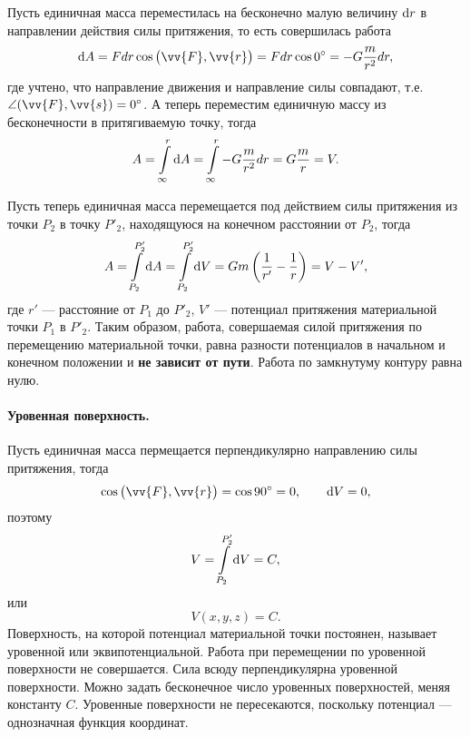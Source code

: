 \documentclass[11pt, a4paper]{article}
\theoremstyle{plain}
\theoremstyle{definition}
\theoremstyle{remark}
\begin{document}
Пусть единичная масса переместилась на бесконечно малую величину $\dif r$ в направлении действия силы
притяжения, то есть совершилась работа
\begin{equation*}
    \dif A = F dr \cos{\left( \vv{F}, \vv{r} \right)} =
    F dr \cos{0^\circ} = -G\dfrac{m}{r^2}dr,
\end{equation*}
где учтено, что направление движения и направление силы совпадают, т.е. $\angle (\vv{F},\vv{s}) =
0^\circ$. А теперь переместим единичную массу из бесконечности в притягиваемую точку, тогда
\begin{equation*}
    A = \int\limits_{\infty}^{r}\dif A = \int\limits_{\infty}^{r} -G\dfrac{m}{r^2}dr =
    G\dfrac{m}{r} = V.
\end{equation*}

Пусть теперь единичная масса перемещается под действием силы притяжения  из точки $P_2$ в точку $P'_2$,
находящуюся на конечном расстоянии от $P_2$, тогда
\begin{equation*}
    A = \int\limits_{P_2}^{P'_2}\dif A =  \int\limits_{P_2}^{P'_2}\dif V = Gm\left( \dfrac{1}{r'} - \dfrac{1}{r}\right) = 
    V - V',
\end{equation*}
где $r'$ --- расстояние от $P_1$ до $P'_2$, $V'$ --- потенциал притяжения материальной точки $P_1$ в
$P'_2$.
Таким образом, работа, совершаемая силой притяжения по перемещению материальной точки, равна
разности потенциалов в начальном и конечном положении и \textbf{не зависит от пути}. Работа по
замкнутуму контуру равна нулю.

\paragraph{Уровенная поверхность.}
Пусть единичная масса пермещается перпендикулярно направлению силы притяжения, тогда
\begin{equation*}
    \cos{\left( \vv{F}, \vv{r} \right)} = \cos{90^\circ} = 0, \qquad \dif V = 0,
\end{equation*}
поэтому 
\begin{equation*}
    V = \int\limits_{P_2}^{P'_2}\dif V = C, 
\end{equation*}
или
\begin{equation*}
    V \left( x, y, z \right) = C.
\end{equation*}
Поверхность, на которой потенциал материальной точки постоянен, называет уровенной или
эквипотенциальной. Работа при перемещении по уровенной поверхности не совершается.
Сила всюду перпендикулярна уровенной поверхности. Можно задать бесконечное число уровенных
поверхностей, меняя константу $C$. Уровенные поверхности не пересекаются, поскольку потенциал ---
однозначная функция координат.
\end{document}
